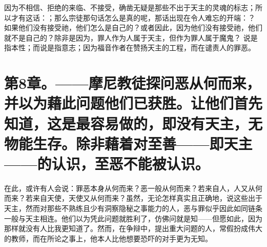 因为不相信、拒绝的来临、不接受，确凿无疑是那些不出于天主的灵魂的标志；所以才有这话：；那么宗徒那句话怎么是真的呢，那话出现在令人难忘的开端：？ 如果他们没有接受祂，他们怎么是自己的？或者因此，因为他们没有接受祂，他们就不是自己的？除非是因为，罪人作为人属于天主，但作为罪人属于魔鬼？ 说是指本性；而说是指意志；因为福音作者在赞扬天主的工程，而在谴责人的罪恶。\par


\section{第8章。——摩尼教徒探问恶从何而来，并以为藉此问题他们已获胜。让他们首先知道，这是最容易做的，即没有天主，无物能生存。除非藉着对至善——即天主——的认识，至恶不能被认识。}

在此，或许有人会说：罪恶本身从何而来？恶一般从何而来？若来自人，人又从何而来？若来自天使，天使又从何而来？虽然，无论怎样真实且正确地，说这些出于天主，然而对那些不熟练且少有洞察隐秘之事能力的人，恶与罪似乎因此如同链条一般与天主相连。他们以为凭此问题就胜利了，仿佛问就是知——但愿如此，因为那样就没有人比我更知道了。然而，在争辩中，提出重大问题的人，常假扮成伟大的教师，而在所论之事上，他本人比他想要恐吓的对手更为无知。\par

